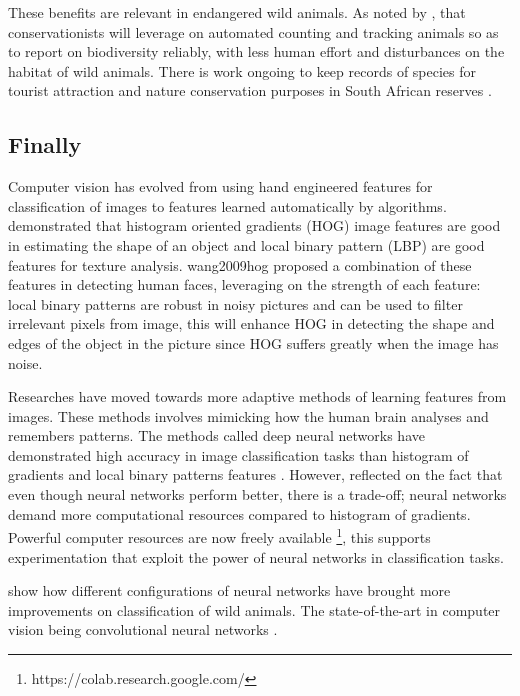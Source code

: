 These benefits are relevant in endangered wild animals. As noted by \citeauthor{norouzzadeh2018automatically} \citeyear{norouzzadeh2018automatically} \cite{norouzzadeh2018automatically}, that conservationists will leverage on automated counting and tracking animals so as to report on biodiversity reliably, with less human effort and disturbances on the habitat of wild animals. There is work ongoing to keep records of species for tourist attraction and nature conservation purposes in South African reserves \cite{marnewick2008evaluating}. 

\subsection{Finally}
Computer vision has evolved from using hand engineered features for classification of images to features learned automatically by algorithms. \citeauthor{wang2009hog} \citeyear{wang2009hog} \cite{wang2009hog} demonstrated that histogram oriented gradients (HOG) image features are good in estimating the shape of an object and local binary pattern (LBP) are good features for texture analysis. \citeauthor{}{wang2009hog} \citeyear{wang2009hog} \cite{wang2009hog} proposed a combination of these features in detecting human faces, leveraging on the strength of each feature: local binary patterns are robust in noisy pictures and can be used to filter irrelevant pixels from image, this will enhance HOG in detecting the shape and edges of the object in the picture since HOG suffers greatly when the image has noise. 

Researches have moved towards more adaptive methods of learning features from images. These methods involves mimicking how the human brain analyses and remembers patterns. The methods called deep neural networks have demonstrated high accuracy in image classification tasks than histogram of gradients and local binary patterns features \cite{suleiman2017towards}. However,  \citeauthor{suleiman2017towards}  \citeyear{suleiman2017towards} \cite{suleiman2017towards}reflected on the fact that even though neural networks perform better, there is a trade-off; neural networks demand more computational resources compared to histogram of gradients. Powerful computer resources are now freely available \footnote{https://colab.research.google.com/}, this supports experimentation that exploit the power of neural networks in classification tasks.     

\citeauthor{weinstein2018computer} \citeyear{weinstein2018computer} \cite{weinstein2018computer} show how different configurations of neural networks have brought more improvements on classification of wild animals. The state-of-the-art in computer vision being convolutional neural networks \cite{verma2018wild}.

